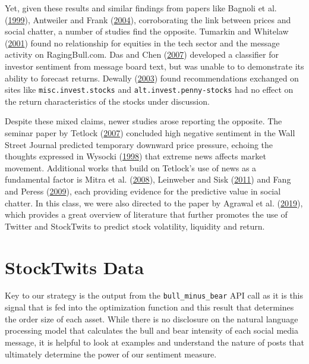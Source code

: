 \documentclass[11,]{article}
\begin{document}
Yet, given these results and similar findings from papers like Bagnoli
et al. (\protect\hyperlink{ref-bagnoli1999}{1999}), Antweiler and Frank
(\protect\hyperlink{ref-antweiler2004}{2004}), corroborating the link
between prices and social chatter, a number of studies find the
opposite. Tumarkin and Whitelaw
(\protect\hyperlink{ref-tumarkin2001}{2001}) found no relationship for
equities in the tech sector and the message activity on RagingBull.com.
Das and Chen (\protect\hyperlink{ref-das2007}{2007}) developed a
classifier for investor sentiment from message board text, but was
unable to to demonstrate its ability to forecast returns. Dewally
(\protect\hyperlink{ref-dewally2003}{2003}) found recommendations
exchanged on sites like \texttt{misc.invest.stocks} and
\texttt{alt.invest.penny-stocks} had no effect on the return
characteristics of the stocks under discussion.

Despite these mixed claims, newer studies arose reporting the opposite.
The seminar paper by Tetlock (\protect\hyperlink{ref-tetlock2007}{2007})
concluded high negative sentiment in the Wall Street Journal predicted
temporary downward price pressure, echoing the thoughts expressed in
Wysocki (\protect\hyperlink{ref-wysocki1998}{1998}) that extreme news
affects market movement. Additional works that build on Tetlock's use of
news as a fundamental factor is Mitra et al.
(\protect\hyperlink{ref-mitra2008}{2008}), Leinweber and Sisk
(\protect\hyperlink{ref-leinweber2011}{2011}) and Fang and Peress
(\protect\hyperlink{ref-fang2009}{2009}), each providing evidence for
the predictive value in social chatter. In this class, we were also
directed to the paper by Agrawal et al.
(\protect\hyperlink{ref-agrawal2019}{2019}), which provides a great
overview of literature that further promotes the use of Twitter and
StockTwits to predict stock volatility, liquidity and return.

\hypertarget{stocktwits-data}{%
\section{StockTwits Data}\label{stocktwits-data}}

Key to our strategy is the output from the \texttt{bull\_minus\_bear}
API call as it is this signal that is fed into the optimization function
and this result that determines the order size of each asset. While
there is no disclosure on the natural language processing model that
calculates the bull and bear intensity of each social media message, it
is helpful to look at examples and understand the nature of posts that
ultimately determine the power of our sentiment measure.
\end{document}
